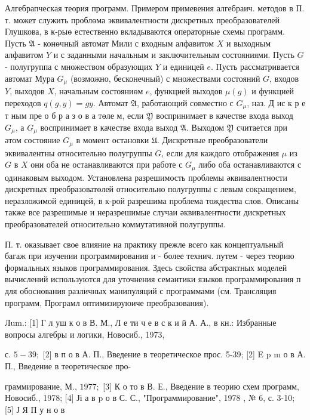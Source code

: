 \documentclass[10pt]{article}
\begin{document}
Алгебрапческая теория программ. Примером примевения алгебраич. методов в П. т. может служить проблөма эквивалентности дискретных преобразователей Глушкова, в к-рыө естественно вкладываются операторные схемы программ. Пусть $\mathfrak{A}$ - конөчный автомат Мили с входным алфавитом $X$ и выходным алфавитом $Y$ и с заданными начальным и заключительным состояниями. Пусть $G$ - полугруппа с множеством образующих $Y$ и единицей $e$. Пусть рассматривается автомат Мура $G_{\mu}$ (возможно, бесконечный) с множествами состояний $G$, входов $Y$, выходов $X$, начальным состояниөм $e$, функцией выходов $\mu(g)$ и функцией переходов $q(g, y)=g y$. Автомат $\mathfrak{A}$, работающий совместно с $G_{\mu}$, наз. Д ис к р е т ным пре о б р а з о в а төле м, если $\mathfrak{Y}$ воспринимает в качестве входа выход $G_{\mu}$, а $G_{\mu}$ воспринимает в качестве входа выход $\mathfrak{A}$. Выходом $\mathfrak{Y}$ считается при әтом состояние $G_{\mu}$ в момент остановки $\mathfrak{U}$. Дискретные преобразователи эквивалентны относительно полугруппы $G$, если для каждого отображения $\mu$ из $G$ в $X$ они оба не останавливаются при работе с $G_{\mu}$ либо оба останавливаются с одинаковым выходом. Установлена разрешимость проблемы әквивалентности дискретных преобразоватөлей относительно полугруппы с левым сокращением, неразложимой единицей, в к-рой разрешима проблема тождества слов. Описаны также все разрешимые и неразрешимые случаи әквивалентности дискретных преобразователей относительно коммутативной полугруппы.



П. т. оказывает свое влияние на практику прежле всего как концептуальный багаж при изучении программирования и - более технич. путем - через теорию формальных языков программирования. Здесь свойства абстрактных моделей вычислений используются для уточнения семантики языков программирования п для обоснования различных манипуляций с программами (см. Трансляция программ, Програмл оптимизируюиче преобразования).



Лum.: [1] Г л уш к о в В. М., Л е ти ч е в с к и й А. А., в кн.: Избранные вопросы алгебры и логики, Новосиб., 1973,

с. $5-39 ;$ [2] в п о в А. П., Введение в теоретическое прос. 5-39; [2] E p m о в А. П., Введение в теоретическое про-

граммирование, М., $1977 ;$ [3] К о то в В. Е., Введение в теорию схем программ, Новосиб., 1978; [4] Јі а в p о в С. С., "Программирование", 1978 , № 6, с. 3-10; [5] Ј Я П у н о в
\end{document}
